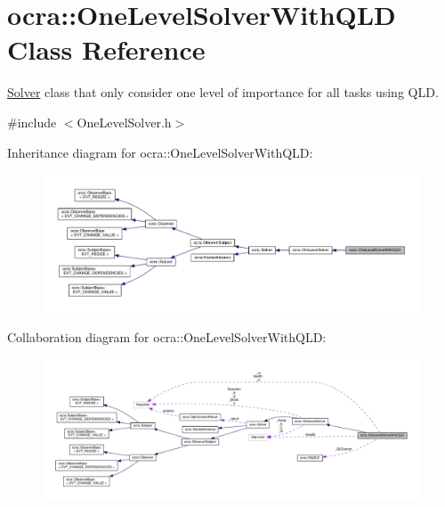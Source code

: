 \hypertarget{classocra_1_1OneLevelSolverWithQLD}{}\section{ocra\+:\+:One\+Level\+Solver\+With\+Q\+LD Class Reference}
\label{classocra_1_1OneLevelSolverWithQLD}


\hyperlink{classocra_1_1Solver}{Solver} class that only consider one level of importance for all tasks using Q\+LD.  




{\ttfamily \#include $<$One\+Level\+Solver.\+h$>$}



Inheritance diagram for ocra\+:\+:One\+Level\+Solver\+With\+Q\+LD\+:
\nopagebreak
\begin{figure}[H]
\begin{center}
\leavevmode
\includegraphics[width=350pt]{d8/d50/classocra_1_1OneLevelSolverWithQLD__inherit__graph}
\end{center}
\end{figure}


Collaboration diagram for ocra\+:\+:One\+Level\+Solver\+With\+Q\+LD\+:
\nopagebreak
\begin{figure}[H]
\begin{center}
\leavevmode
\includegraphics[width=350pt]{dc/d3a/classocra_1_1OneLevelSolverWithQLD__coll__graph}
\end{center}
\end{figure}
